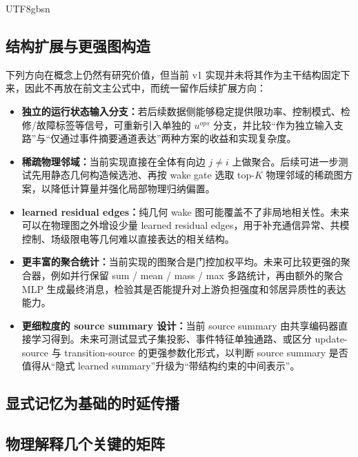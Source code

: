 \documentclass[11pt]{article}
\begin{document}
\begin{CJK}{UTF8}{gbsn}
\subsection{结构扩展与更强图构造}

下列方向在概念上仍然有研究价值，但当前 v1 实现并未将其作为主干结构固定下来，因此不再放在前文主公式中，而统一留作后续扩展方向：

\begin{itemize}
  \item \textbf{独立的运行状态输入分支：}若后续数据侧能够稳定提供限功率、控制模式、检修/故障标签等信号，可重新引入单独的 $u^{ops}$ 分支，并比较“作为独立输入支路”与“仅通过事件摘要通道表达”两种方案的收益和实现复杂度。
  \item \textbf{稀疏物理邻域：}当前实现直接在全体有向边 $j\neq i$ 上做聚合。后续可进一步测试先用静态几何构造候选池、再按 wake gate 选取 top-$K$ 物理邻域的稀疏图方案，以降低计算量并强化局部物理归纳偏置。
  \item \textbf{learned residual edges：}纯几何 wake 图可能覆盖不了非局地相关性。未来可以在物理图之外增设少量 learned residual edges，用于补充通信异常、共模控制、场级限电等几何难以直接表达的相关结构。
  \item \textbf{更丰富的聚合统计：}当前实现的图聚合是门控加权平均。未来可比较更强的聚合器，例如并行保留 sum / mean / mass / max 多路统计，再由额外的聚合 MLP 生成最终消息，检验其是否能提升对上游负担强度和邻居异质性的表达能力。
  \item \textbf{更细粒度的 source summary 设计：}当前 source summary 由共享编码器直接学习得到。未来可测试显式子集投影、事件特征单独通路、或区分 update-source 与 transition-source 的更强参数化形式，以判断 source summary 是否值得从“隐式 learned summary”升级为“带结构约束的中间表示”。
\end{itemize}

\subsection{显式记忆为基础的时延传播}

\subsection{物理解释几个关键的矩阵}

\end{CJK}
\end{document}

